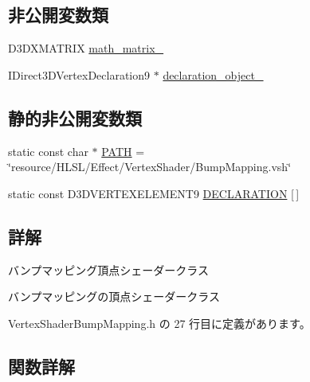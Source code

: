 \subsection*{非公開変数類}
\begin{DoxyCompactItemize}
\item 
D3\+D\+X\+M\+A\+T\+R\+IX \mbox{\hyperlink{class_vertex_shader_bump_mapping_add6402e968835f3fe5e9c7681c33daef}{math\+\_\+matrix\+\_\+}}
\item 
I\+Direct3\+D\+Vertex\+Declaration9 $\ast$ \mbox{\hyperlink{class_vertex_shader_bump_mapping_a6e45d81a2a9c8ba7071b7f2686264a49}{declaration\+\_\+object\+\_\+}}
\end{DoxyCompactItemize}
\subsection*{静的非公開変数類}
\begin{DoxyCompactItemize}
\item 
static const char $\ast$ \mbox{\hyperlink{class_vertex_shader_bump_mapping_aa4b686f9aeb9e327ca79adf5974bc86d}{P\+A\+TH}} = \char`\"{}resource/H\+L\+SL/Effect/Vertex\+Shader/Bump\+Mapping.\+vsh\char`\"{}
\item 
static const D3\+D\+V\+E\+R\+T\+E\+X\+E\+L\+E\+M\+E\+N\+T9 \mbox{\hyperlink{class_vertex_shader_bump_mapping_ae4b0d38d68dc86b47ae17693cb214e06}{D\+E\+C\+L\+A\+R\+A\+T\+I\+ON}} \mbox{[}$\,$\mbox{]}
\end{DoxyCompactItemize}


\subsection{詳解}
バンプマッピング頂点シェーダークラス 

バンプマッピングの頂点シェーダークラス 

 Vertex\+Shader\+Bump\+Mapping.\+h の 27 行目に定義があります。



\subsection{関数詳解}
\mbox{\label{class_vertex_shader_bump_mapping_a7979584d035fff86d386c99617a8dd2c}} 
